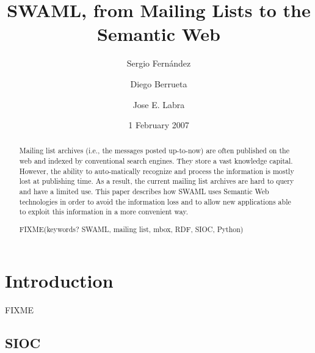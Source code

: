 \documentclass{llncs}
\begin{document}
\title{SWAML, from Mailing Lists to the Semantic Web}



\author{
Sergio Fern\'andez \and Diego Berrueta \and Jose E. Labra
}





\date{1 February 2007}

\maketitle

\begin{abstract}

Mailing list archives (i.e., the messages posted up-to-now) are often published 
on the web and indexed by conventional search engines. They store a vast 
knowledge capital. However, the ability to auto-matically recognize and process 
the information is mostly lost at publishing time. As a result, the current 
mailing list archives are hard to query and have a limited use. This paper 
describes how SWAML uses Semantic Web technologies in order to avoid the
information loss and to allow new applications able to exploit this 
information in a more convenient way.

FIXME(keywords? SWAML, mailing list, mbox, RDF, SIOC, Python)

\end{abstract}

\section{Introduction}

FIXME

\subsection{SIOC}
\end{document}
